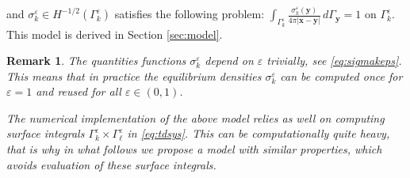 \documentclass[]{article}
\newtheorem{remark}{Remark}
\numberwithin{equation}{section}
\numberwithin{theorem}{section}
\numberwithin{lemma}{section}
\numberwithin{corollary}{section}
\numberwithin{proposition}{section}
\numberwithin{definition}{section}
\newcommand{\re}{\varepsilon}
\begin{document}
	and $\sigma_k^{\re}\in H^{-1/2}(\Gamma^{\re}_k)$  satisfies the following problem: $ \int_{\Gamma_k^{\re}} \frac{\sigma_k^{\re}(\boldsymbol{y})}{4 \pi | \boldsymbol{x} - \boldsymbol{y}|} \, d\Gamma_{\boldsymbol{y}} = 1 \text{ on }\Gamma_k^{\re}$. This model is derived in Section \ref{sec:model}.
	\begin{remark}
		The quantities functions ${\sigma}^{\re}_k$ depend on $\re$ trivially, see \eqref{eq:sigmakeps}. This means that in practice the equilibrium densities $\sigma_k^{\re}$ can be computed once for $\re=1$ and reused for all $\re \in (0,1)$.
		
		The numerical implementation of the above model relies as well on computing surface integrals $\Gamma_{k}^{\re}\times \Gamma_{\ell}^{\re}$ in \eqref{eq:tdsys}. This can be computationally quite heavy, that is why in what follows we propose a model with similar properties, which avoids evaluation of these surface integrals. 
	\end{remark}
	
\end{document}
